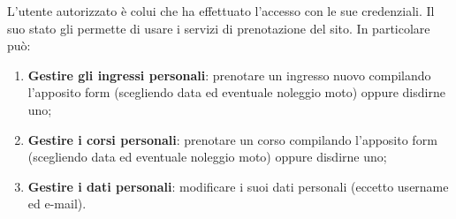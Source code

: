 L'utente autorizzato è colui che ha effettuato l'accesso con le sue credenziali. Il suo stato gli permette di usare i servizi di prenotazione del sito. In particolare può:
\begin{enumerate}
    \item \textbf{Gestire gli ingressi personali}: prenotare un ingresso nuovo compilando l'apposito form (scegliendo data ed eventuale noleggio moto) oppure disdirne uno;
    
    \item \textbf{Gestire i corsi personali}: prenotare un corso compilando l'apposito form (scegliendo data ed eventuale noleggio moto) oppure disdirne uno;
    
    \item \textbf{Gestire i dati personali}: modificare i suoi dati personali (eccetto username ed e-mail).
\end{enumerate}